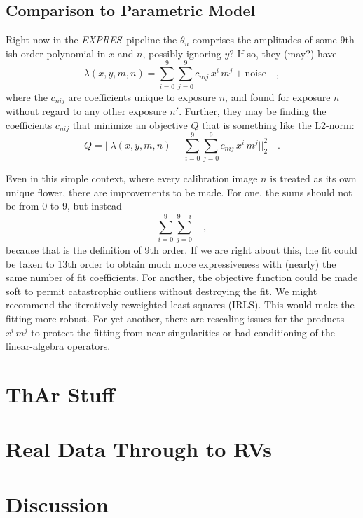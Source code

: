 \documentclass[12pt, letterpaper]{article}
\newcommand{\project}[1]{\textsl{#1}}
\newcommand{\acronym}[1]{{\small{#1}}}
\newcommand{\expres}{\project{\acronym{EXPRES}}}
\begin{document}
\subsection{Comparison to Parametric Model}
Right now in the \expres\ pipeline the $\theta_{n}$ comprises the
amplitudes of some 9th-ish-order polynomial in $x$ and $n$, possibly
ignoring $y$?
If so, they (may?) have
\begin{equation}
\lambda(x,y,m,n) = \sum_{i=0}^9\sum_{j=0}^9 c_{nij}\, x^i\,m^j + \mathrm{noise}
\quad ,
\end{equation}
where the $c_{nij}$ are coefficients unique to exposure $n$, and
found for exposure $n$ without regard to any other exposure $n'$.
Further, they may be finding the coefficients $c_{nij}$ that
minimize an objective $Q$ that is something like the L2-norm:
\begin{equation}
Q = ||\lambda(x,y,m,n) - \sum_{i=0}^9\sum_{j=0}^9 c_{nij}\, x^i\,m^j||_2^2
\quad .
\end{equation}

Even in this simple context, where every calibration image $n$ is
treated as its own unique flower, there are improvements to be
made.
For one, the sums should not be from 0 to 9, but instead
\begin{equation}
\sum_{i=0}^9\sum_{j=0}^{9-i}
\quad ,
\end{equation}
because that is the definition of 9th order.
If we are right about this, the fit could be taken to 13th order to obtain
much more expressiveness with (nearly) the same number of fit coefficients.
For another, the objective function could be made soft to permit
catastrophic outliers without destroying the fit.
We might recommend the iteratively reweighted least squares (IRLS).
This would make the fitting more robust.
For yet another, there are rescaling issues for the products $x^i\,m^j$ to
protect the fitting from near-singularities or bad conditioning of the
linear-algebra operators.


\section{ThAr Stuff}

\section{Real Data Through to RVs}

\section{Discussion} \label{sec:discussion}
\end{document}
